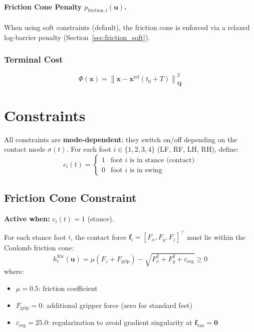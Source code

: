 \documentclass[11pt,a4paper]{article}
\newcommand{\wnorm}[2]{\left\| #1 \right\|_{#2}^2}
\begin{document}
\paragraph{Friction Cone Penalty $p_{\text{friction},i}(\bm{u})$.}
When using soft constraints (default), the friction cone is enforced via a relaxed log-barrier penalty (Section~\ref{sec:friction_soft}).

\subsubsection{Terminal Cost}

\begin{equation}
	\Phi(\bm{x}) = \wnorm{\bm{x} - \bm{x}^{\text{ref}}(t_0 + T)}{\bm{Q}}
\end{equation}


\section{Constraints}
\label{sec:constraints}

All constraints are \textbf{mode-dependent}: they switch on/off depending on the contact mode $\sigma(t)$. For each foot $i \in \{1, 2, 3, 4\}$ (LF, RF, LH, RH), define:
\begin{equation}
	c_i(t) = \begin{cases} 1 & \text{foot } i \text{ is in stance (contact)} \\ 0 & \text{foot } i \text{ is in swing} \end{cases}
\end{equation}

\subsection{Friction Cone Constraint}
\label{sec:friction_cone}

\textbf{Active when:} $c_i(t) = 1$ (stance).

For each stance foot $i$, the contact force $\bm{f}_i = [F_x, F_y, F_z]^\top$ must lie within the Coulomb friction cone:
\begin{equation}
	\boxed{
		h_i^{\text{fric}}(\bm{u}) = \mu (F_z + F_{\text{grip}}) - \sqrt{F_x^2 + F_y^2 + \varepsilon_{\text{reg}}} \geq 0
	}
\end{equation}
where:
\begin{itemize}
	\item $\mu = 0.5$: friction coefficient
	\item $F_{\text{grip}} = 0$: additional gripper force (zero for standard feet)
	\item $\varepsilon_{\text{reg}} = 25.0$: regularization to avoid gradient singularity at $\bm{f}_{\text{tan}} = \bm{0}$
\end{itemize}
\end{document}
